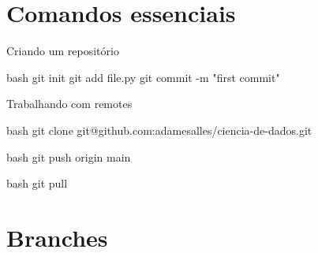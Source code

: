 \documentclass[xcolor=dvipsnames,t,aspectratio=169]{beamer}
\begin{document}
\section{Comandos essenciais}

\begin{frame}[c, fragile]{Criando um repositório}

\begin{code}{bash}
git init
git add file.py
git commit -m "first commit"
\end{code}

\end{frame}


\begin{frame}[c, fragile]{Trabalhando com remotes}

\begin{code}{bash}
git clone git@github.com:adamesalles/ciencia-de-dados.git
\end{code}

\begin{code}{bash}
git push origin main
\end{code}

\begin{code}{bash}
git pull
\end{code}

\end{frame}


\section{Branches}
\end{document}
